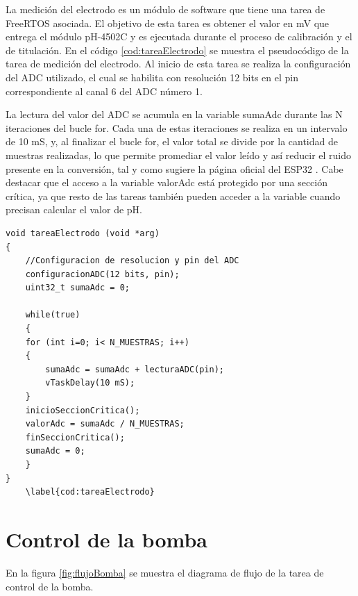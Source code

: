 La medición del electrodo es un módulo de software que tiene una tarea de FreeRTOS asociada. El objetivo de esta tarea es obtener el valor en mV que entrega el módulo pH-4502C y es ejecutada durante el proceso de calibración y el de titulación. En el código \ref{cod:tareaElectrodo} se muestra el pseudocódigo de la tarea de medición del electrodo. Al inicio de esta tarea se realiza la configuración del ADC utilizado, el cual se habilita con resolución 12 bits en el pin correspondiente al canal 6 del ADC número 1.

La lectura del valor del ADC se acumula en la variable sumaAdc durante las N iteraciones del bucle for. Cada una de estas iteraciones se realiza en un intervalo de 10 mS, y, al finalizar el bucle for, el valor total se divide por la cantidad de muestras realizadas, lo que permite promediar el valor leído y así reducir el ruido presente en la conversión, tal y como sugiere la página oficial del ESP32 \citep{WEBSITE:2}. Cabe destacar que el acceso a la variable valorAdc está protegido por una sección crítica, ya que resto de las tareas también pueden acceder a la variable cuando precisan calcular el valor de pH.

\begin{lstlisting}[label=cod:vControl,caption=Pseudocódigo de la tarea de medición de pH.]
void tareaElectrodo (void *arg)
{
    //Configuracion de resolucion y pin del ADC
    configuracionADC(12 bits, pin);
    uint32_t sumaAdc = 0;

    while(true)
    {
    for (int i=0; i< N_MUESTRAS; i++)
    {
        sumaAdc = sumaAdc + lecturaADC(pin);  
        vTaskDelay(10 mS);
    } 
    inicioSeccionCritica(); 
    valorAdc = sumaAdc / N_MUESTRAS;
    finSeccionCritica();
    sumaAdc = 0;
    }
}
	\label{cod:tareaElectrodo}
\end{lstlisting}

\section{Control de la bomba}

En la figura \ref{fig:flujoBomba} se muestra el diagrama de flujo de la tarea de control de la bomba.


